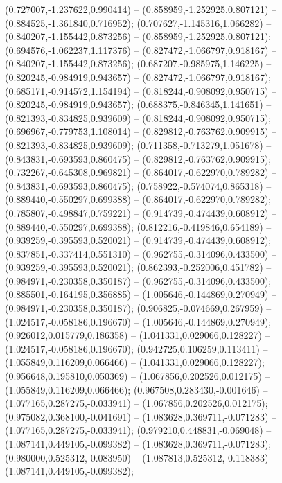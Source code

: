  (0.727007,-1.237622,0.990414) -- (0.858959,-1.252925,0.807121) -- (0.884525,-1.361840,0.716952);
 (0.707627,-1.145316,1.066282) -- (0.840207,-1.155442,0.873256) -- (0.858959,-1.252925,0.807121);
 (0.694576,-1.062237,1.117376) -- (0.827472,-1.066797,0.918167) -- (0.840207,-1.155442,0.873256);
 (0.687207,-0.985975,1.146225) -- (0.820245,-0.984919,0.943657) -- (0.827472,-1.066797,0.918167);
 (0.685171,-0.914572,1.154194) -- (0.818244,-0.908092,0.950715) -- (0.820245,-0.984919,0.943657);
 (0.688375,-0.846345,1.141651) -- (0.821393,-0.834825,0.939609) -- (0.818244,-0.908092,0.950715);
 (0.696967,-0.779753,1.108014) -- (0.829812,-0.763762,0.909915) -- (0.821393,-0.834825,0.939609);
 (0.711358,-0.713279,1.051678) -- (0.843831,-0.693593,0.860475) -- (0.829812,-0.763762,0.909915);
 (0.732267,-0.645308,0.969821) -- (0.864017,-0.622970,0.789282) -- (0.843831,-0.693593,0.860475);
 (0.758922,-0.574074,0.865318) -- (0.889440,-0.550297,0.699388) -- (0.864017,-0.622970,0.789282);
 (0.785807,-0.498847,0.759221) -- (0.914739,-0.474439,0.608912) -- (0.889440,-0.550297,0.699388);
 (0.812216,-0.419846,0.654189) -- (0.939259,-0.395593,0.520021) -- (0.914739,-0.474439,0.608912);
 (0.837851,-0.337414,0.551310) -- (0.962755,-0.314096,0.433500) -- (0.939259,-0.395593,0.520021);
 (0.862393,-0.252006,0.451782) -- (0.984971,-0.230358,0.350187) -- (0.962755,-0.314096,0.433500);
 (0.885501,-0.164195,0.356885) -- (1.005646,-0.144869,0.270949) -- (0.984971,-0.230358,0.350187);
 (0.906825,-0.074669,0.267959) -- (1.024517,-0.058186,0.196670) -- (1.005646,-0.144869,0.270949);
 (0.926012,0.015779,0.186358) -- (1.041331,0.029066,0.128227) -- (1.024517,-0.058186,0.196670);
 (0.942725,0.106259,0.113411) -- (1.055849,0.116209,0.066466) -- (1.041331,0.029066,0.128227);
 (0.956648,0.195810,0.050369) -- (1.067856,0.202526,0.012175) -- (1.055849,0.116209,0.066466);
 (0.967508,0.283430,-0.001646) -- (1.077165,0.287275,-0.033941) -- (1.067856,0.202526,0.012175);
 (0.975082,0.368100,-0.041691) -- (1.083628,0.369711,-0.071283) -- (1.077165,0.287275,-0.033941);
 (0.979210,0.448831,-0.069048) -- (1.087141,0.449105,-0.099382) -- (1.083628,0.369711,-0.071283);
 (0.980000,0.525312,-0.083950) -- (1.087813,0.525312,-0.118383) -- (1.087141,0.449105,-0.099382);
